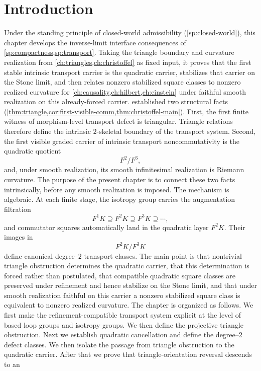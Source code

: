 \section{Introduction}
Under the standing principle of closed-world admissibility
(\cref{sp:closed-world}), this chapter develops the inverse-limit
interface consequences of \cref{sp:compactness,sp:transport}.
Taking the triangle boundary and curvature realization from
\cref{ch:triangles,ch:christoffel} as fixed input, it proves that the
first stable intrinsic transport carrier is the quadratic carrier,
stabilizes that carrier on the Stone limit, and then relates nonzero
stabilized square classes to nonzero realized curvature for
\cref{ch:causality,ch:hilbert,ch:einstein} under faithful smooth
realization on this already-forced carrier.
 established two structural facts
(\cref{thm:triangle,cor:first-visible-comm,thm:christoffel-main}).
First, the first finite witness of morphism-level transport defect is
triangular. Triangle relations therefore define the intrinsic
\(2\)-skeletal boundary of the transport system.
Second, the first visible graded carrier of intrinsic transport
noncommutativity is the quadratic quotient
\[
	F^2/F^3,
\]
and, under smooth realization, its smooth infinitesimal realization is
Riemann curvature.
The purpose of the present chapter is to connect these two facts
intrinsically, before any smooth realization is imposed.
The mechanism is algebraic.
At each finite stage, the isotropy group carries the augmentation
filtration
\[
	F^1K \supseteq F^2K \supseteq F^3K \supseteq \cdots,
\]
and commutator squares automatically land in the quadratic layer
\(F^2K\). Their images in
\[
	F^2K/F^3K
\]
define canonical degree--\(2\) transport classes.
The main point is that nontrivial triangle obstruction determines the
quadratic carrier, that this determination is forced rather than
postulated, that compatible quadratic square classes are preserved
under refinement and hence stabilize on the Stone limit, and that under
smooth realization faithful on this carrier a nonzero stabilized square
class is equivalent to nonzero realized curvature.
The chapter is organized as follows.
We first make the refinement-compatible transport system explicit at the
level of based loop groups and isotropy groups.
We then define the projective triangle obstruction.
Next we establish quadratic cancellation and define the degree--\(2\)
defect classes.
We then isolate the passage from triangle obstruction to the quadratic
carrier.
After that we prove that triangle-orientation reversal descends to an
